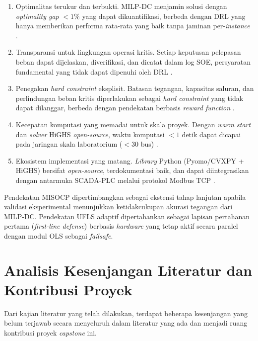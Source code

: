 \begin{enumerate}
    \item[a.] Optimalitas terukur dan terbukti. MILP-DC menjamin solusi dengan \textit{optimality gap} $< 1\%$ yang dapat dikuantifikasi, berbeda dengan DRL yang hanya memberikan performa rata-rata yang baik tanpa jaminan per-\textit{instance} \cite{Sarwar2020, Sarwar2022}.
    \item[b.] Transparansi untuk lingkungan operasi kritis. Setiap keputusan pelepasan beban dapat dijelaskan, diverifikasi, dan dicatat dalam log SOE, persyaratan fundamental yang tidak dapat dipenuhi oleh DRL \cite{Babagana2025}.
    \item[c.] Penegakan \textit{hard constraint} eksplisit. Batasan tegangan, kapasitas saluran, dan perlindungan beban kritis diperlakukan sebagai \textit{hard constraint} yang tidak dapat dilanggar, berbeda dengan pendekatan berbasis \textit{reward function} \cite{Sarwar2020, Arenas2026}.
    \item[d.] Kecepatan komputasi yang memadai untuk skala proyek. Dengan \textit{warm start} dan \textit{solver} HiGHS \textit{open-source}, waktu komputasi $< 1$ detik dapat dicapai pada jaringan skala laboratorium ($<30$ bus) \cite{Sarwar2022}.
    \item[e.] Ekosistem implementasi yang matang. \textit{Library} Python (Pyomo/CVXPY + HiGHS) bersifat \textit{open-source}, terdokumentasi baik, dan dapat diintegrasikan dengan antarmuka SCADA-PLC melalui protokol Modbus TCP \cite{Babagana2025, Colorado2018}.
\end{enumerate}

Pendekatan MISOCP dipertimbangkan sebagai ekstensi tahap lanjutan apabila validasi eksperimental menunjukkan ketidakcukupan akurasi tegangan dari MILP-DC. Pendekatan UFLS adaptif dipertahankan sebagai lapisan pertahanan pertama (\textit{first-line defense}) berbasis \textit{hardware} yang tetap aktif secara paralel dengan modul OLS sebagai \textit{failsafe}.

\section{Analisis Kesenjangan Literatur dan Kontribusi Proyek}
\label{sec:Analisis_Kesenjangan_Literatur}

Dari kajian literatur yang telah dilakukan, terdapat beberapa kesenjangan yang belum terjawab secara menyeluruh dalam literatur yang ada dan menjadi ruang kontribusi proyek \textit{capstone} ini.

